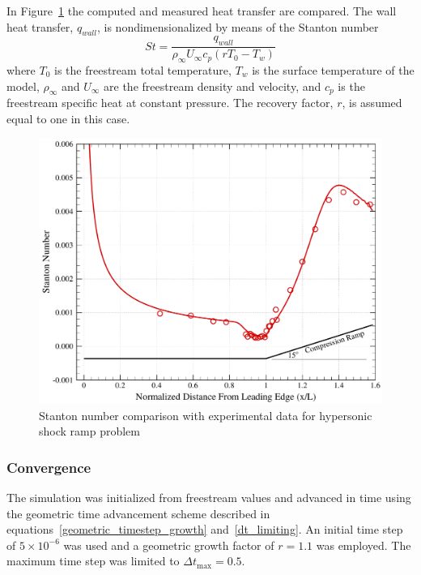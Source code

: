 In Figure~\ref{fig:holden_shock_ramp_exp_st} the computed and measured heat transfer are compared.  The wall heat transfer, $q_{wall}$, is nondimensionalized by means of the Stanton number
\begin{equation}
  St = \frac{q_{wall}}{\rho_\infty U_\infty c_p \left(r T_0 - T_w\right)}
\end{equation}
where $T_0$ is the freestream total temperature, $T_w$ is the surface temperature of the model, $\rho_\infty$ and $U_\infty$ are the freestream density and velocity, and $c_p$ is the freestream specific heat at constant pressure.  The recovery factor, $r$, is assumed equal to one in this case.  
\begin{figure}[hbtp]
  \begin{center}
    \includegraphics[width=\textwidth]{figures/holden_ramp/stanton}
    \caption{Stanton number comparison with experimental data for hypersonic shock ramp problem\label{fig:holden_shock_ramp_exp_st}}
  \end{center}
\end{figure}

\clearpage
\subsubsection{Convergence}
The simulation was initialized from freestream values and advanced in time using the geometric time advancement scheme described in equations~\eqref{geometric_timestep_growth} and~\eqref{dt_limiting}.  An initial time step of $5\times 10^{-6}$ was used and a geometric growth factor of $r=1.1$ was employed.  The maximum time step was limited to $\Delta t_{\text{max}} = 0.5$.

